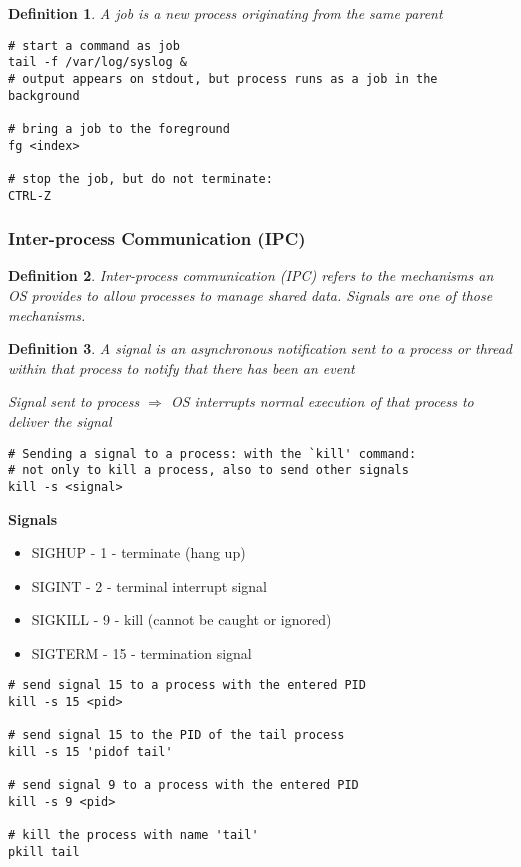 \documentclass{article}
\newtheorem{theorem}{Definition}[section]
\begin{document}
\begin{theorem}
    A job is a new process originating from the same parent
\end{theorem}

\begin{verbatim}
# start a command as job
tail -f /var/log/syslog &
# output appears on stdout, but process runs as a job in the background

# bring a job to the foreground
fg <index>

# stop the job, but do not terminate:
CTRL-Z
\end{verbatim}


\subsubsection{Inter-process Communication (IPC)}

\begin{theorem}
    Inter-process communication (IPC) refers to the mechanisms an OS provides
    to allow processes to manage shared data. Signals are one of those mechanisms.
\end{theorem}

\begin{theorem}
    A signal is an asynchronous notification sent to a process or thread within that process
    to notify that there has been an event
    
    Signal sent to process $\Rightarrow$ OS interrupts normal execution of that process to deliver the signal
\end{theorem}

\begin{verbatim}
# Sending a signal to a process: with the `kill' command:
# not only to kill a process, also to send other signals
kill -s <signal>
\end{verbatim}

\textbf{Signals}

\begin{itemize}
    \item SIGHUP - 1 - terminate (hang up)
    \item SIGINT - 2 - terminal interrupt signal
    \item SIGKILL - 9 - kill (cannot be caught or ignored)
    \item SIGTERM - 15 - termination signal
\end{itemize}

\begin{verbatim}
# send signal 15 to a process with the entered PID
kill -s 15 <pid>

# send signal 15 to the PID of the tail process
kill -s 15 'pidof tail'

# send signal 9 to a process with the entered PID
kill -s 9 <pid>

# kill the process with name 'tail'
pkill tail
\end{verbatim}
\end{document}
